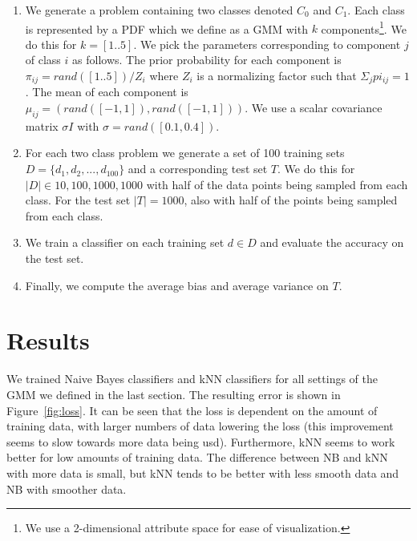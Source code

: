 \documentclass[a4paper]{article}
\begin{document}
\begin{enumerate}
\item We generate a problem containing two classes denoted $C_0$ and $C_1$. Each class is represented by a \ac{PDF} which we define as a \ac{GMM} with $k$ components\footnote{We use a 2-dimensional attribute space for ease of visualization.}. We do this for $k = [1 .. 5]$. We pick the parameters corresponding to component $j$ of class $i$ as follows. The prior probability for each component is $\pi_{ij} = rand([1 .. 5]) / Z_i$ where $Z_i$ is a normalizing factor such that $\Sigma_{j} pi_{ij} = 1$. The mean of each component is $\mu_{ij} = (rand([-1,1]),rand([-1,1]))$. We use a scalar covariance matrix $\sigma I$ with $\sigma = rand([0.1,0.4])$.
\item For each two class problem we generate a set of 100 training sets $D = \{d_1, d_2, ..., d_{100}\}$ and a corresponding test set $T$. We do this for $|D| \in {10, 100, 1000, 1000}$ with half of the data points being sampled from each class. For the test set $|T| = 1000$, also with half of the points being sampled from each class.
\item We train a classifier on each training set $d \in D$ and evaluate the accuracy on the test set.
\item Finally, we compute the average bias and average variance on $T$.
\end{enumerate}



\section{Results}
\label{sec:results}

We trained Naive Bayes classifiers and kNN classifiers for all settings of the \ac{GMM} we defined in the last section. The resulting error is shown in Figure~\ref{fig:loss}. It can be seen that the loss is dependent on the amount of training data, with larger numbers of data lowering the loss (this improvement seems to slow towards more data being usd). Furthermore, kNN seems to work better for low amounts of training data. The difference between NB and kNN with more data is small, but kNN tends to be better with less smooth data and NB with smoother data.
\end{document}
